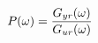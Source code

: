 \documentclass[preview]{standalone}
\begin{document}
\begin{align*}
\special{dvisvgm:raw <g id='unique000'>}P(\omega)=\frac{G_{yr}(\omega)}{G_{ur}(\omega)}\special{dvisvgm:raw </g>}
\end{align*}
\end{document}
